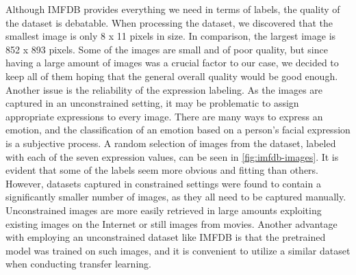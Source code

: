 \noindent Although IMFDB provides everything we need in terms of labels, the quality of the dataset is debatable. When processing the dataset, we discovered that the smallest image is only 8 x 11 pixels in size. In comparison, the largest image is 852 x 893 pixels. Some of the images are small and of poor quality, but since having a large amount of images was a crucial factor to our case, we decided to keep all of them hoping that the general overall quality would be good enough. Another issue is the reliability of the expression labeling. As the images are captured in an unconstrained setting, it may be problematic to assign appropriate expressions to every image. There are many ways to express an emotion, and the classification of an emotion based on a person's facial expression is a subjective process. A random selection of images from the dataset, labeled with each of the seven expression values, can be seen in \autoref{fig:imfdb-images}. It is evident that some of the labels seem more obvious and fitting than others. However, datasets captured in constrained settings were found to contain a significantly smaller number of images, as they all need to be captured manually. Unconstrained images are more easily retrieved in large amounts exploiting existing images on the Internet or still images from movies. Another advantage with employing an unconstrained dataset like IMFDB is that the pretrained model was trained on such images, and it is convenient to utilize a similar dataset when conducting transfer learning.

